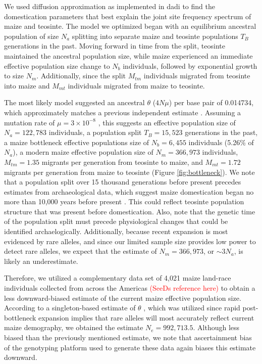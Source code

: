 \documentclass{pnastwo}
\begin{document}
\begin{article}
We used diffusion approximation as implemented in
dadi \cite{gutenkunst2009} to find the domestication parameters that best explain
the joint site frequency spectrum of maize and teosinte.  The model we optimized began with an
equilibrium ancestral population of size $N_a$
splitting into separate maize and teosinte populations $T_B$ generations in the past. Moving forward in
time from the split, teosinte maintained the ancestral population size, while
maize experienced an immediate effective population size change to
$N_b$ individuals, followed by exponential growth to size
$N_m$. Additionally, since the split $M_{tm}$ individuals migrated
from teosinte into maize and $M_{mt}$ individuals migrated from maize
to teosinte.

The most likely model suggested an ancestral $\theta$ ($4N\mu$) per base pair of
0.014734, which approximately matches a previous independent estimate \cite{eyre1998}. Assuming a mutation rate of $\mu =
3 \times 10^{-8}$ \cite{clark2005}, this suggests an effective
population size of $N_a = 122,783$ individuals, a population split
$T_B = 15,523$ generations in the past, a maize bottleneck
effective populations size of $N_b = 6,455$ individuals (5.26\% of
$N_a$), a modern maize effective population size of $N_m = 366,973$
individuals, $M_{tm} = 1.35$ migrants per generation from teosinte to
maize, and $M_{mt} = 1.72$ migrants per generation from maize to
teosinte (Figure \ref{fig:bottleneck}). We note that a population
split over 15 thousand generations before present precedes estimates
from
archaeological data, which suggest maize domestication began
no more than 10,000 years before present \cite{smith1995}. This could reflect teosinte population structure that was present before
domestication. Also, note that the genetic time of the population
split must precede physiological changes that could be identified
archaelogically.   Additionally, because recent expansion is
most evidenced by rare alleles, and since our limited sample size provides low
power to detect rare alleles, we expect that the estimate of  $N_m = 366,973$, or $\sim 3N_a$, is likely an underestimate.

Therefore, we utilized a complementary data set of 4,021 maize land-race individuals collected
from across the Americas \textcolor{red}{(SeeDs reference here)} to
obtain a less downward-biased estimate of the current maize effective
population size. According to a singleton-based estimate of $\theta$
\cite{fu1993}, which was utilized since rapid post-bottleneck expansion
implies that rare alleles will most accurately reflect current maize
demography, we obtained the estimate $N_e =
  992,713.5$. Although less biased than the previously mentioned
estimate, we note that ascertainment bias of the
genotyping platform used to generate these data again biases this
estimate downward.


\end{article}
\end{document}

